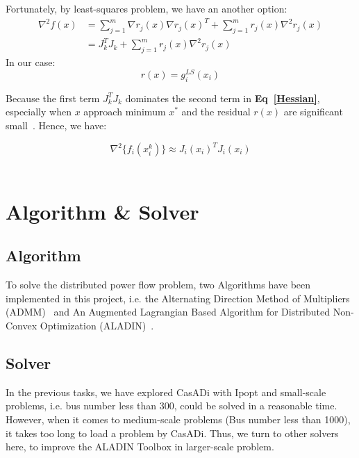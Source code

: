 \documentclass{article}
\begin{document}
Fortunately, by least-squares problem, we have an another option: 
    \begin{subequations}
        \label{sensitivities}
        \begin{align}
        \nabla^2 f(x) &= \sum^{m}_{j=1} \nabla r_j(x) \nabla r_j(x)^T + \sum^{m}_{j=1}r_j(x)\nabla^2 r_j(x)\\
        &= J^{T}_k J_k + \sum^{m}_{j=1}r_j(x)\nabla^2 r_j(x)~\label{Hessian}
        \end{align}
    \end{subequations}
In our case:
    \begin{equation}
        r(x) = g_i^{LS}(x_i)
    \end{equation}

\noindent Because the first term $J^{T}_k J_k$ dominates the second term in \textbf{Eq~\ref{Hessian}}, especially when $x$ approach minimum $x^\ast$ and the residual $r(x)$ are significant small~\citep{Numerical_Optimization}. Hence, we have:

    \begin{equation}
        \nabla^2 \{f_i(x_i^k)\} \approx J_i(x_i)^T J_i(x_i)
    \end{equation} \\

\section{Algorithm \& Solver}

\subsection{Algorithm}

To solve the distributed power flow problem, two Algorithms have been implemented in this project, i.e. the Alternating Direction Method of Multipliers (ADMM)~\citep{ADMM} and An Augmented Lagrangian Based Algorithm for Distributed Non-Convex Optimization (ALADIN)~\citep{ALADIN}. 

\subsection{Solver}

In the previous tasks, we have explored CasADi with Ipopt and small-scale problems, i.e. bus number less than 300, could be solved in a reasonable time. However, when it comes to medium-scale problems (Bus number less than 1000), it takes too long to load a problem by CasADi. Thus, we turn to other solvers here, to improve the ALADIN Toolbox in larger-scale problem.\\
\end{document}
